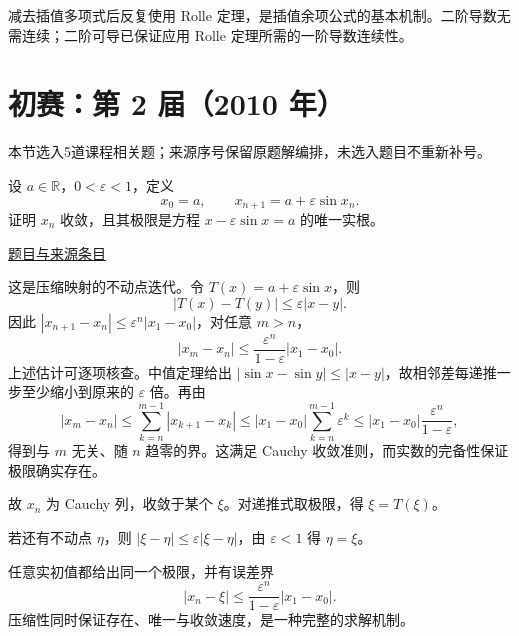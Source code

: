\documentclass[UTF8,12pt,a4paper,fontset=fandol]{ctexart}
\begin{document}
\begin{remark}[方法与条件]减去插值多项式后反复使用 Rolle 定理，是插值余项公式的基本机制。二阶导数无需连续；二阶可导已保证应用 Rolle 定理所需的一阶导数连续性。\end{remark}

\section{初赛：第 2 届（2010 年）}

本节选入5道课程相关题；来源序号保留原题解编排，未选入题目不重新补号。

\begin{example}[来源序号1]\label{ex:pre02-math:1}\label{pr:pre02-math:1}

设 $a\in\mathbb R$，$0<\varepsilon<1$，定义
\[
x_0=a,\qquad x_{n+1}=a+\varepsilon\sin x_n.
\]
证明 $x_n$ 收敛，且其极限是方程 $x-\varepsilon\sin x=a$ 的唯一实根。

\par\href{https://github.com/lzxcr/cmc-mathematics/blob/64916fa1fdbc3e444a652eca204d5669058ee321/src/problems/preliminary/02/01.md}{题目与来源条目}

\end{example}

\begin{solve}\label{ans:pre02-math:1}

这是压缩映射的不动点迭代。令 $T(x)=a+\varepsilon\sin x$，则
\[
|T(x)-T(y)|\le\varepsilon|x-y|.
\]
因此 $|x_{n+1}-x_n|\le\varepsilon^n|x_1-x_0|$，对任意 $m>n$，
\[
|x_m-x_n|\le\frac{\varepsilon^n}{1-\varepsilon}|x_1-x_0|.
\]
上述估计可逐项核查。中值定理给出 $|\sin x-\sin y|\le|x-y|$，故相邻差每递推一步至少缩小到原来的 $\varepsilon$ 倍。再由
\[
|x_m-x_n|\le\sum_{k=n}^{m-1}|x_{k+1}-x_k|
\le |x_1-x_0|\sum_{k=n}^{m-1}\varepsilon^k
\le |x_1-x_0|\frac{\varepsilon^n}{1-\varepsilon},
\]
得到与 $m$ 无关、随 $n$ 趋零的界。这满足 Cauchy 收敛准则，而实数的完备性保证极限确实存在。

故 $x_n$ 为 Cauchy 列，收敛于某个 $\xi$。对递推式取极限，得 $\xi=T(\xi)$。

若还有不动点 $\eta$，则 $|\xi-\eta|\le\varepsilon|\xi-\eta|$，由 $\varepsilon<1$ 得 $\eta=\xi$。

\end{solve}

\begin{remark}[方法与条件]任意实初值都给出同一个极限，并有误差界
\[
|x_n-\xi|\le\frac{\varepsilon^n}{1-\varepsilon}|x_1-x_0|.
\]
压缩性同时保证存在、唯一与收敛速度，是一种完整的求解机制。\end{remark}
\end{document}
